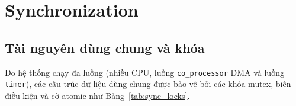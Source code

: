 \documentclass[12pt,a4paper]{article}
\begin{document}
	\begingroup
	\sloppy
	\section{Synchronization}

	\subsection{Tài nguyên dùng chung và khóa}
	Do hệ thống chạy đa luồng (nhiều CPU, luồng \texttt{co\_processor} DMA và luồng \texttt{timer}), các cấu trúc dữ liệu dùng chung được bảo vệ bởi các khóa mutex, biến điều kiện và cờ atomic như Bảng~\ref{tab:sync_locks}.
\end{document}
